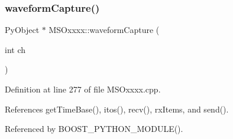 \subsubsection{\texorpdfstring{waveform\+Capture()}{waveformCapture()}}
{\footnotesize\ttfamily Py\+Object $\ast$ M\+S\+Oxxxx\+::waveform\+Capture (\begin{DoxyParamCaption}\item[{int}]{ch }\end{DoxyParamCaption})}



Definition at line 277 of file M\+S\+Oxxxx.\+cpp.



References get\+Time\+Base(), itos(), recv(), rx\+Items, and send().



Referenced by B\+O\+O\+S\+T\+\_\+\+P\+Y\+T\+H\+O\+N\+\_\+\+M\+O\+D\+U\+L\+E().


